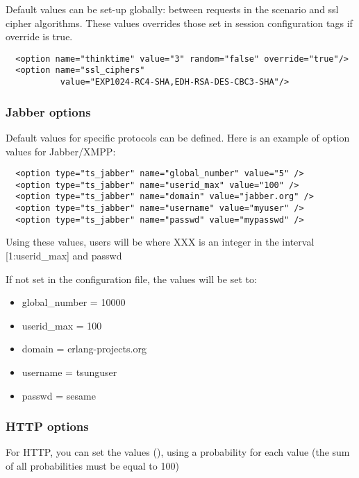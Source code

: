 \documentclass{IDXDOC-en}
\begin{document}
\par Default values can be set-up globally:  between requests
in the scenario and ssl cipher algorithms. These values overrides
those set in session configuration tags if override is true.
\begin{Verbatim}
  <option name="thinktime" value="3" random="false" override="true"/>
  <option name="ssl_ciphers"
           value="EXP1024-RC4-SHA,EDH-RSA-DES-CBC3-SHA"/>
\end{Verbatim}

\subsubsection{Jabber options}
\label{sec:jabber-options}

Default values for specific protocols can be defined. Here is an
example of option values for Jabber/XMPP:

\begin{Verbatim}
  <option type="ts_jabber" name="global_number" value="5" />
  <option type="ts_jabber" name="userid_max" value="100" />
  <option type="ts_jabber" name="domain" value="jabber.org" />
  <option type="ts_jabber" name="username" value="myuser" />
  <option type="ts_jabber" name="passwd" value="mypasswd" />
\end{Verbatim}

Using these values, users will be  where XXX is an integer in
the interval [1:userid\_max] and passwd  

If not set in the configuration file, the values will be set to:
\begin{itemize}
\item global\_number = 10000
\item userid\_max    = 100
\item domain   = erlang-projects.org
\item username = tsunguser
\item passwd   = sesame
\end{itemize}

\subsubsection{HTTP options}

For HTTP, you can set the  values
(), using a probability for each
value (the sum of all probabilities must be equal to 100)
\end{document}

